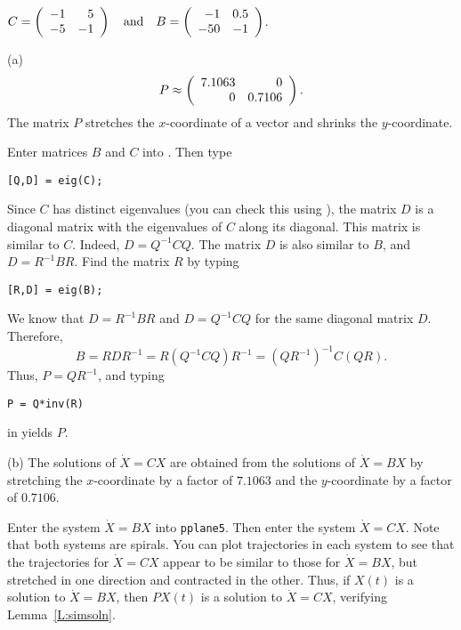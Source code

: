 \documentclass{ximera}
\begin{document}
\begin{computerExercise} \label{E:simb}
$C = \left(\begin{array}{rr} -1 & 5\\ -5 &-1\end{array}\right) \quad\mbox{and}\quad B = \left(\begin{array}{rr} -1 & 0.5\\ -50 &-1\end{array}\right)$.

\begin{solution}

(a) \ans
\[
P \approx \left(\begin{array}{rr} 7.1063 & 0\\ 0 &0.7106\end{array}\right).
\]
The matrix $P$ stretches the $x$-coordinate of a vector and shrinks the
$y$-coordinate.

\soln Enter matrices $B$ and $C$ into \Matlabp.  Then type
\begin{verbatim}
[Q,D] = eig(C);
\end{verbatim}
Since $C$ has distinct eigenvalues (you can check this using
\Matlabp), the matrix $D$ is a diagonal matrix with the eigenvalues of
$C$ along its diagonal.  This matrix is similar to $C$.  Indeed, $D =
Q^{-1}CQ$.  The matrix $D$ is also similar to $B$, and $D= R^{-1}BR$.
Find the matrix $R$ by typing
\begin{verbatim}
[R,D] = eig(B);
\end{verbatim}
We know that $D = R^{-1}BR$ and $D = Q^{-1}CQ$ for the same diagonal
matrix $D$.  Therefore,
\[
B = RDR^{-1} = R(Q^{-1}CQ)R^{-1} = (QR^{-1})^{-1}C(QR).
\]
Thus, $P = QR^{-1}$, and typing
\begin{verbatim}
P = Q*inv(R)
\end{verbatim}
in \Matlab yields $P$.

(b) \ans The solutions of $\dot{X} = CX$ are obtained from the solutions
of $\dot{X} = BX$ by stretching the $x$-coordinate by a factor of $7.1063$
and the $y$-coordinate by a factor of $0.7106$.

\soln Enter the system $\dot{X} = BX$ into {\tt pplane5}.  Then enter the
system $\dot{X} = CX$.  Note that both systems are spirals.  You can
plot trajectories in each system to see that the trajectories for
$\dot{X} = CX$ appear to be similar to those for $\dot{X} = BX$, but
stretched in one direction and contracted in the other.  Thus, if
$X(t)$ is a solution to $\dot{X} = BX$, then $PX(t)$ is a solution to
$\dot{X} = CX$, verifying Lemma~\ref{L:simsoln}.

\end{solution}
\end{computerExercise}
\end{document}
